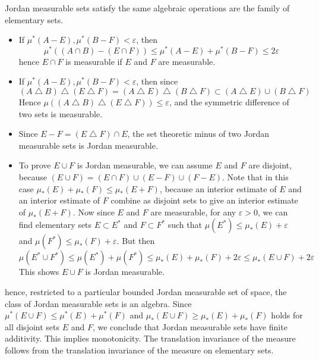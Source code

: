 Jordan measurable sets satisfy the same algebraic operations are the family of elementary sets.
%
\begin{itemize}
    \item If $\mu^*(A - E), \mu^*(B - F) < \varepsilon$, then
    \[ \mu^*((A \cap B) - (E \cap F)) \leq \mu^*(A - E) + \mu^*(B - F) \leq 2 \varepsilon \]
    hence $E \cap F$ is measurable if $E$ and $F$ are measurable.

    \item If $\mu^*(A - E), \mu^*(B - F) < \varepsilon$, then since
    \[ (A \bigtriangleup B) \bigtriangleup (E \bigtriangleup F) = (A \bigtriangleup E) \bigtriangleup (B \bigtriangleup F) \subset (A \bigtriangleup E) \cup (B \bigtriangleup F) \]
    Hence $\mu((A \bigtriangleup B) \bigtriangleup (E \bigtriangleup F)) \leq \varepsilon$, and the symmetric difference of two sets is measurable.

    \item Since $E - F = (E \bigtriangleup F) \cap E$, the set theoretic minus of two Jordan measurable sets is Jordan measurable.

    \item To prove $E \cup F$ is Jordan measurable, we can assume $E$ and $F$ are disjoint, because $(E \cup F) = (E \cap F) \cup (E - F) \cup (F - E)$. Note that in this case $\mu_*(E) + \mu_*(F) \leq \mu_*(E + F)$, because an interior estimate of $E$ and an interior estimate of $F$ combine as disjoint sets to give an interior estimate of $\mu_*(E + F)$. Now since $E$ and $F$ are measurable, for any $\varepsilon > 0$, we can find elementary sets $E \subset E^*$ and $F \subset F^*$ such that $\mu(E^*) \leq \mu_*(E) + \varepsilon$ and $\mu(F^*) \leq \mu_*(F) + \varepsilon$. But then
    \[ \mu(E^* \cup F^*) \leq \mu(E^*) + \mu(F^*) \leq \mu_*(E) + \mu_*(F) + 2\varepsilon \leq \mu_*(E \cup F) + 2\varepsilon \]
    This shows $E \cup F$ is Jordan measurable.
\end{itemize}
%
hence, restricted to a particular bounded Jordan measurable set of space, the class of Jordan measurable sets is an algebra. Since $\mu^*(E \cup F) \leq \mu^*(E) + \mu^*(F)$ and $\mu_*(E \cup F) \geq \mu_*(E) + \mu_*(F)$ holds for all disjoint sets $E$ and $F$, we conclude that Jordan measurable sets have finite additivity. This implies monotonicity. The translation invariance of the measure follows from the translation invariance of the measure on elementary sets.

